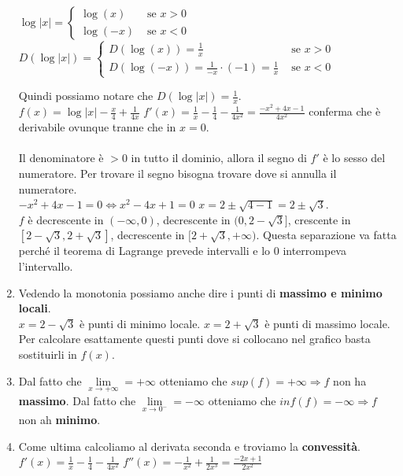 \begin{example}
\begin{enumerate}
    $\log|x| = \begin{cases}\log(x) & \text{ se } x>0 \\ \log(-x) & \text{ se } x<0\end{cases}$\hfill
    $D(\log|x|) = \begin{cases}D(\log(x)) = \frac{1}{x} & \text{ se } x>0 \\D(\log(-x)) = \frac{1}{-x} \cdot (-1) = \frac{1}{x} & \text{ se } x<0\end{cases}$
    
    Quindi possiamo notare che $D(\log |x|) = \frac{1}{x}$.\\
    $f(x) = \log|x| - \frac{x}{4} + \frac{1}{4x}$ \hspace{.3cm} $f'(x) = \frac{1}{x} - \frac{1}{4} -\frac{1}{4x^2} = \frac{-x^2 + 4x -1}{4x^2}$ conferma che è derivabile ovunque tranne che in $x = 0$.\\\\
    Il denominatore è $> 0$ in tutto il dominio, allora il segno di $f'$ è lo sesso del numeratore. Per trovare il segno bisogna trovare dove si annulla il numeratore.\\
    $-x^2 + 4x - 1 = 0 \Longleftrightarrow x^2 - 4x + 1 = 0$ \hspace{.3cm} $x = 2 \pm \sqrt{4-1} = 2 \pm \sqrt{3}$.\\
    $f$ è decrescente in $(-\infty,0)$, decrescente in $(0,2-\sqrt{3}]$, crescente in $[2-\sqrt{3}, 2+\sqrt{3}]$, decrescente in $[2+\sqrt{3},+\infty)$. Questa separazione va fatta perché il teorema di Lagrange prevede intervalli e lo 0 interrompeva l'intervallo.
    \item Vedendo la monotonia possiamo anche dire i punti di \textbf{massimo e minimo locali}. \\
    $x = 2 - \sqrt{3}$ è punti di minimo locale. \hspace{.3cm} $x = 2 + \sqrt{3}$ è punti di massimo locale.\\
    Per calcolare esattamente questi punti dove si collocano nel grafico basta sostituirli in $f(x)$.
    \item Dal fatto che $\lim\limits_{x\to +\infty} = +\infty$ otteniamo che $sup(f) = +\infty \Longrightarrow f$ non ha \textbf{massimo}. Dal fatto che $\lim\limits_{x\to 0^-}=-\infty$ otteniamo che $inf(f) = -\infty \Longrightarrow f$ non ah \textbf{minimo}.
    \item Come ultima calcoliamo al derivata seconda e troviamo la \textbf{convessità}.\\
    $f'(x) = \frac{1}{x} - \frac{1}{4} - \frac{1}{4x^2}$ \hspace{.5cm} $f''(x) = -\frac{1}{x^2} +\frac{1}{2x^3} = \frac{-2x + 1}{2x^2}$\\

\end{enumerate}
\end{example}
